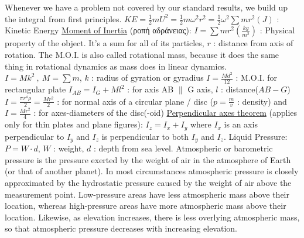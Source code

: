 \documentclass[12pt]{article}
\begin{document}
\begin{flushleft}
	\textbullet \quad Whenever we have a problem not covered by our standard results, we build up the integral from first principles. \linebreak 
	\textbullet \quad $\displaystyle KE = \frac{1}{2} mU^2 = \frac{1}{2} m\omega^2 r^2 = \frac{1}{2} \omega^2 \sum mr^2 (J) $  :  Kinetic Energy \linebreak 
	\textbullet \quad \uline{Moment of Inertia} (\textgreek{ροπή αδράνειας}): $\displaystyle I = \sum mr^2 (\frac{kg}{m^2}) $  :  Physical property of the object. It's a sum for all of its particles, $r$  :  distance from axis of rotation. \linebreak 
	The M.O.I. is also called rotational mass, because it does the same thing in rotational dynamics as mass does in linear dynamics. \linebreak 
	\textbullet \quad $\displaystyle I=Mk^2\ , \ M = \sum m$, $k$  :  radius of gyration or gyradius \linebreak 
	\textbullet \quad $\displaystyle I=\frac{Md^2}{12} $  :  M.O.I. for rectangular plate \linebreak 
	\textbullet \quad $\displaystyle I_{AB} = I_G + Ml^2 $  :  for axis AB $\parallel$ G axis, $l$  :  distance($AB-G$) \linebreak 
	\textbullet \quad $\displaystyle I = \frac{\pi r^4 \rho}{2} = \frac{Mr^2}{2}$  :  for normal axis of a circular plane / disc ($\displaystyle p = \frac{m}{v}$  :  density) and $\displaystyle I = \frac{Mr^2}{4}$  :  for axes-diameters of the disc(-oid) \linebreak 
	\textbullet \quad \uline{Perpendicular axes theorem} (applies only for thin plates and plane figures): $I_z = I_x + I_y$ \linebreak 
	where $I_x$ is an axis perpendicular to $I_y$ and $I_z$ is perpendicular to both $I_y$ and $I_z$. \linebreak 
	\textbullet \quad Liquid Pressure: $P=W\cdot d$, $W$  :  weight, $d$  :  depth from sea level. \linebreak 
	\textbullet \quad Atmospheric or barometric pressure is the pressure exerted by the weight of air in the atmosphere of Earth (or that of another planet). In most circumstances atmospheric pressure is closely approximated by the hydrostatic pressure caused by the weight of air above the measurement point. Low-pressure areas have less atmospheric mass above their location, whereas high-pressure areas have more atmospheric mass above their location. Likewise, as elevation increases, there is less overlying atmospheric mass, so that atmospheric pressure decreases with increasing elevation. \linebreak 

\end{flushleft}
\end{document}
